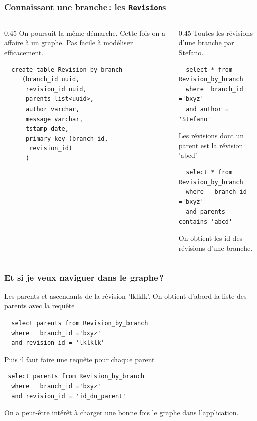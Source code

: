 	
\begin{frame}[fragile] \frametitle{Connaissant une branche\,: les \texttt{Revision}s}


\begin{columns}
    \begin{column}{0.45\textwidth}
  On poursuit la même démarche. Cette fois on
  a affaire à un graphe. Pas facile à modéliser efficacement.
    
  \begin{verbatim}
  create table Revision_by_branch
     (branch_id uuid, 
      revision_id uuid,
      parents list<uuid>,
      author varchar,
      message varchar,
      tstamp date, 
      primary key (branch_id, 
       revision_id)
      )
  \end{verbatim}
  
  
   \end{column}
 \begin{column}{0.45\textwidth}
   Toutes les révisions d'une branche par Stefano.
  
  \begin{verbatim}
  select * from Revision_by_branch 
  where  branch_id ='bxyz'
  and author = 'Stefano'
  \end{verbatim}
  
   \vfill
    Les révisions dont un parent est la révision 'abcd'
   
 \begin{verbatim}
  select * from Revision_by_branch 
  where   branch_id ='bxyz'
  and parents contains 'abcd'
  \end{verbatim}

\vfill 
  On obtient les id des révisions d'une branche. 
  
\end{column}
\end{columns}
	
\end{frame}
	


\begin{frame}[fragile] \frametitle{Et si je veux naviguer dans le graphe\,?}

Les parents et ascendants de la révision 'lklklk'. 
On obtient d'abord la liste des parents avec la requête
   
 \begin{verbatim}
  select parents from Revision_by_branch 
  where   branch_id ='bxyz'
  and revision_id = 'lklklk'
  \end{verbatim}

\vfill 
  Puis il faut faire une requête pour \alert{chaque} parent
  
  
 \begin{verbatim}
 select parents from Revision_by_branch 
  where   branch_id ='bxyz'
  and revision_id = 'id_du_parent'
  \end{verbatim}
  
\vfill

On a peut-être intérêt à charger une bonne fois le graphe
dans l'application.
\end{frame}
	
